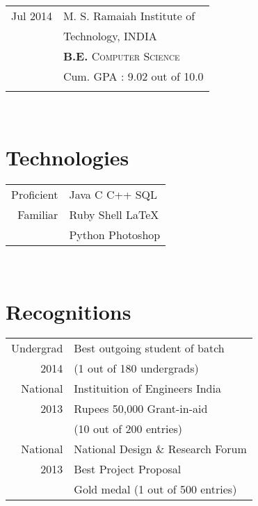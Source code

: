 \documentclass[10pt]{article} %
\begin{document}
{\begin{minipage}[t]{0.4\textwidth}
\begin{tabular}{rl}
Jul 2014 & \large{M. S. Ramaiah Institute of} \\
& \large{Technology,} \normalsize{INDIA} \\
&  \textbf{B.E.} \textsc{Computer Science} \\ 
& \small Cum. GPA : 9.02 out of 10.0\\
&\\
\end{tabular}\\[10pt]


\section{\textbf{Technologies}}
\begin{tabular}{rl}
Proficient
& Java \textbullet{} C \textbullet{} C++ \textbullet{} SQL
& \\
Familiar
& Ruby \textbullet{} Shell \textbullet{} \LaTeX \\
& Python \textbullet{} Photoshop\\
\end{tabular}\\


\section{\textbf{Recognitions}} 
\begin{tabular}{rl}
Undergrad & Best outgoing student of batch\\
2014 &  (1 out of 180 undergrads) \\
National & Instituition of Engineers India \\
2013  &  Rupees 50,000 Grant-in-aid  \\
         & (10 out of 200 entries) \\
National & National Design \& Research Forum  \\
2013     &  Best Project Proposal \\
         & Gold medal (1 out of 500 entries)  \\
\end{tabular}\\[10pt]


\end{minipage}}
\end{document}
